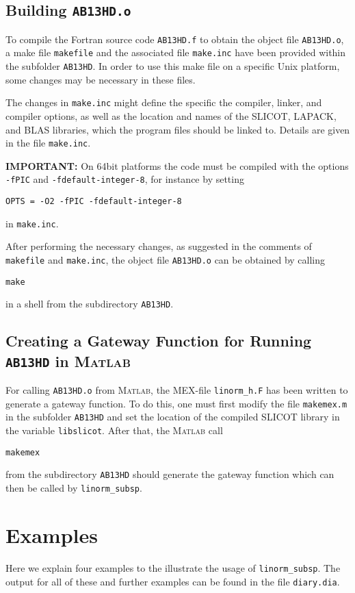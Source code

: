 \documentclass[10pt,a4paper]{article}
\begin{document}
\subsection{Building \texttt{AB13HD.o}}
To compile the Fortran source code \texttt{AB13HD.f} to obtain the object file \texttt{AB13HD.o}, a make file \texttt{makefile} and the associated file \texttt{make.inc} have been provided within the subfolder \texttt{AB13HD}. In order to use this make file on a specific Unix platform, some changes may be necessary in these files. 

The changes in \texttt{make.inc} might define the specific the compiler, linker, and compiler options, as well as the location and names of the SLICOT, LAPACK, and BLAS libraries, which the program files should be linked to. Details are given in the file \texttt{make.inc}.

\textbf{IMPORTANT:} On 64bit platforms the code must be compiled with the options \texttt{-fPIC} and \texttt{-fdefault-integer-8}, for instance by setting
\begin{verbatim}
OPTS = -O2 -fPIC -fdefault-integer-8
\end{verbatim}
in \texttt{make.inc}.

After performing the necessary changes, as suggested in the comments of \texttt{makefile} and \texttt{make.inc}, the object file \texttt{AB13HD.o} can be obtained by calling
\begin{verbatim}
make
\end{verbatim}
in a shell from the subdirectory \texttt{AB13HD}.

\subsection{Creating a Gateway Function for Running \texttt{AB13HD} in \textsc{Matlab}}
For calling \texttt{AB13HD.o} from \textsc{Matlab}, the MEX-file \texttt{linorm\_h.F} has been written to generate a gateway function. To do this, one must first modify the file \texttt{makemex.m} in the subfolder \texttt{AB13HD} and set the location of the compiled SLICOT library in the variable \texttt{libslicot}. After that, the \textsc{Matlab} call
\begin{verbatim}
makemex
\end{verbatim}
from the subdirectory \texttt{AB13HD} should generate the gateway function which can then be called by \texttt{linorm\_subsp}.

\section{Examples}
Here we explain four examples to the illustrate the usage of \texttt{linorm\_subsp}. The output for all of these and further examples can be found in the file \texttt{diary.dia}.
\end{document}

